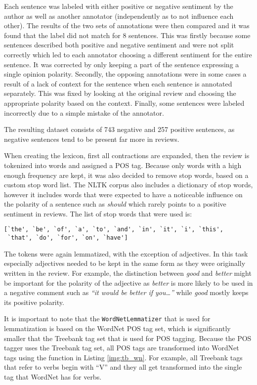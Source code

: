 Each sentence was labeled with either positive or negative sentiment by the author as well as another annotator (independently as to not influence each other). 
The results of the two sets of annotations were then compared and it was found that the label did not match for 8 sentences. This was firstly because some sentences described both positive and negative sentiment and were not split correctly which led to each annotator choosing a different sentiment for the entire sentence. It was corrected by only keeping a part of the sentence expressing a single opinion polarity. Secondly, the opposing annotations were in some cases a result of a lack of context for the sentence when each sentence is annotated separately. This was fixed by looking at the original review and choosing the appropriate polarity based on the context. Finally, some sentences were labeled incorrectly due to a simple mistake of the annotator.

The resulting dataset consists of 743 negative and 257 positive sentences, as negative sentences tend to be present far more in reviews.

When creating the lexicon, first all contractions are expanded, then the review is tokenized into words and assigned a POS tag. Because only words with a high enough frequency are kept, it was also decided to remove stop words, based on a custom stop word list. The NLTK corpus also includes a dictionary of stop words, however it  includes words that were expected to have a noticeable influence on the polarity of a sentence such as \textit{should} which rarely points to a positive sentiment in reviews. The list of stop words that were used is:
\begin{lstlisting}
[`the', `be', `of', `a', `to', `and', `in', `it', `i', `this', 
 `that', `do', `for', `on', `have']
\end{lstlisting}

The tokens were again lemmatized, with the exception of adjectives. In this task especially adjectives needed to be kept in the same form as they were originally written in the review. For example, the distinction between  \textit{good} and \textit{better} might be important for the polarity of the adjective as \textit{better} is more likely to be used in a negative comment such as \textit{``it would be better if you\ldots''} while \textit{good} mostly keeps its positive polarity.

It is important to note that the \texttt{WordNetLemmatizer} that is used for lemmatization is based on the WordNet POS tag set, which is significantly smaller that the Treebank tag set that is used for POS tagging. Because the POS tagger uses the Treebank tag set, all POS tags are transformed into WordNet tags using the function in Listing \ref{img:tb_wn}. For example, all Treebank tags that refer to verbs begin with ``V'' and they all get transformed into the single tag that WordNet has for verbs.



